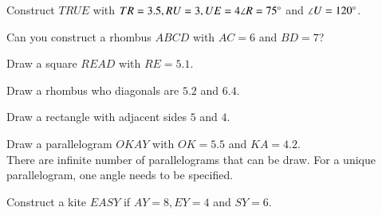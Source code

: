 \item Construct $TRUE$ with $TR = 3.5, RU = 3, UE = 4 \angle R = 75\degree$ and $\angle U = 120\degree$.
\\
\solution 




\item Can you construct a rhombus $ABCD$ with $AC = 6$ and $BD = 7$?
\\
\solution 


\item Draw a square $READ$ with $RE = 5.1$.
\\
\solution 

\item Draw a rhombus who diagonals are $5.2$ and $6.4$.
\\
\solution 


\item Draw a rectangle with adjacent sides $5$ and $4$.
\\
\solution 


\item Draw a parallelogram $OKAY$ with $OK = 5.5$ and $KA = 4.2$.
\\
\solution  There are infinite number of parallelograms that can be draw.  For a unique parallelogram, one angle
needs to be specified.

\item Construct a kite $EASY$ if $AY = 8, EY = 4$ and $SY = 6$.


%
